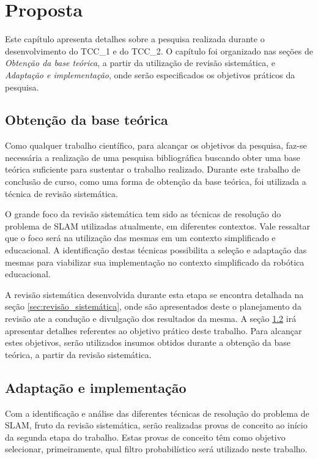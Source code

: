 \chapter[Proposta]{Proposta}

Este capítulo apresenta detalhes sobre a pesquisa realizada durante o desenvolvimento do TCC\_1 e do TCC\_2. O capítulo foi organizado nas seções de \textit{Obtenção da base teórica}, a partir da utilização de revisão sistemática, e \textit{Adaptação e implementação}, onde serão especificados os objetivos práticos da pesquisa.

\section{Obtenção da base teórica} %
\label{sec:obtenção_da_base_teórica}
	
	Como qualquer trabalho científico, para alcançar os objetivos da pesquisa, faz-se necessária a realização de uma pesquisa bibliográfica buscando obter uma base teórica suficiente para sustentar o trabalho realizado. Durante este trabalho de conclusão de curso, como uma forma de obtenção da base teórica, foi utilizada a técnica de revisão sistemática.

	O grande foco da revisão sistemática tem sido as técnicas de resolução do problema de SLAM utilizadas atualmente, em diferentes contextos. Vale ressaltar que o foco será na utilização das mesmas em um contexto simplificado e educacional. A identificação destas técnicas possibilita a seleção e adaptação das mesmas para viabilizar sua implementação no contexto simplificado da robótica educacional.

	A revisão sistemática desenvolvida durante esta etapa se encontra detalhada na seção \ref{sec:revisão_sistemática}, onde são apresentados deste o planejamento da revisão ate a condução e divulgação dos resultados da mesma. A seção \ref{sec:adaptação_e_implementação} irá apresentar detalhes referentes ao objetivo prático deste trabalho. Para alcançar estes objetivos, serão utilizados insumos obtidos durante a obtenção da base teórica, a partir da revisão sistemática.


\section{Adaptação e implementação} %
\label{sec:adaptação_e_implementação}

	Com a identificação e análise das diferentes técnicas de resolução do problema de SLAM, fruto da revisão sistemática, serão realizadas provas de conceito ao início da segunda etapa do trabalho. Estas provas de conceito têm como objetivo selecionar, primeiramente, qual filtro probabilístico será utilizado neste trabalho.

